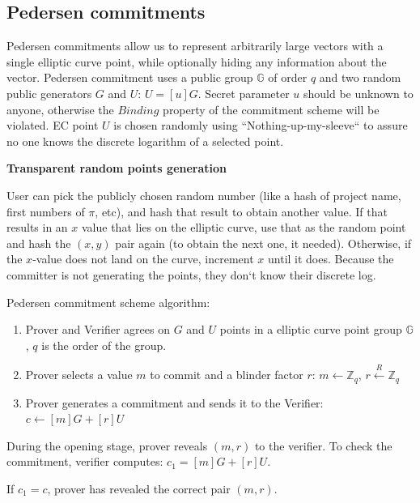 \documentclass[../lecture-notes.tex]{subfiles}
\begin{document}
\subsection{Pedersen commitments}

Pedersen commitments allow us to represent arbitrarily large vectors with a single elliptic curve point, while optionally hiding any information about the vector. Pedersen commitment uses a public group $\mathbb{G}$ of order $q$ and two random public generators $G$ and $U$: $U = [u]G$. Secret parameter $u$ should be unknown to anyone, otherwise the $\textit{Binding}$ property of the commitment scheme will be violated.
EC point $U$ is chosen randomly using ``Nothing-up-my-sleeve`` to assure no one knows the discrete logarithm of a selected point.

\begin{remark}
    \textbf{Transparent random points generation}

    User can pick the publicly chosen random number (like a hash of project name, first numbers of $\pi$, etc), and hash that result to obtain another value. If that results in an $x$ value that lies on the elliptic curve, use that as the random point and hash the $(x, y)$ pair again (to obtain the next one, it needed). Otherwise, if the $x$-value does not land on the curve, increment $x$ until it does. Because the committer is not generating the points, they don`t know their discrete log. 
\end{remark}

Pedersen commitment scheme algorithm:
\begin{enumerate}
    \item Prover and Verifier agrees on $G$ and $U$ points in a elliptic curve point group $\mathbb{G}$, $q$ is the order of the group.
    \item Prover selects a value $m$ to commit and a blinder factor $r$:
            $m \leftarrow \mathbb{Z}_q$,
            $r \xleftarrow{R} \mathbb{Z}_q$
    \item Prover generates a commitment and sends it to the Verifier:
            $c \gets [m]G + [r]U$
\end{enumerate}

During the opening stage, prover reveals $(m, r)$ to the verifier. 
To check the commitment, verifier computes: $c_1 = [m]G + [r]U$.

If $c_1 = c$, prover has revealed the correct pair $(m, r)$.
\end{document}
